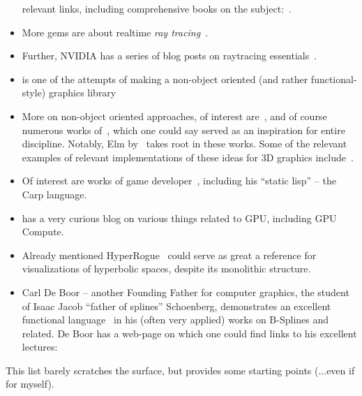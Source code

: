 \begin{itemize}
relevant links, including comprehensive books on the subject:~\citet{rtrIntersections}.
\item More gems are about realtime \emph{ray tracing}~\citet{rtGems}.
\item Further, NVIDIA has a series of blog posts on raytracing
essentials~\cite{rtEssentials}.
\item \citet{yoctoGL} is one of the attempts of making a non-object oriented
(and rather functional-style) graphics library
\item More on non-object oriented approaches, of interest
are~\citet{functional3DGraphics,elliottTBAG}, and of course numerous works
of~\citet{ActiveVRML,elliottAnimations}, which one could say served as an
inspiration for entire discipline. Notably, Elm by~\citet{elm} takes root in
these works. Some of the relevant examples of relevant implementations
of these ideas for 3D graphics include~\citet{muncheongFunctionalGames}.
\item Of interest are works of game developer~\citet{carpLang}, including his
``static lisp'' -- the Carp language.
\item \citet{levienPrefixSum} has a very curious blog on various things related
to GPU, including GPU Compute.
\item Already mentioned HyperRogue~\cite{hyperrogue} could serve as great a
reference for visualizations of hyperbolic spaces, despite its monolithic
structure.
\item Carl De Boor -- another Founding Father for computer graphics, the student of Isaac Jacob
``father of splines'' Schoenberg, demonstrates an excellent functional
language~\cite{deboorSmoothingBspl}
in his (often very applied) works on B-Splines and related. De Boor has a web-page
on which one could find links to his excellent lectures:~\cite{deboorPage}
\end{itemize}

This list barely scratches the surface, but provides some starting points
(...even if for myself).
